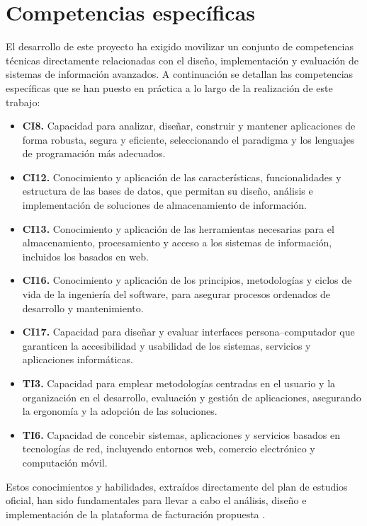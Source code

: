 \section{Competencias específicas}
\begin{large}
El desarrollo de este proyecto ha exigido movilizar un conjunto de competencias técnicas directamente relacionadas con el diseño, implementación y evaluación de sistemas de información avanzados. A continuación se detallan las competencias específicas que se han puesto en práctica a lo largo de la realización de este trabajo:

\begin{itemize}[label=\raisebox{0.15ex}{\scriptsize$\blacksquare$}]
  \item \textbf{CI8.} Capacidad para analizar, diseñar, construir y mantener aplicaciones de forma robusta, segura y eficiente, seleccionando el paradigma y los lenguajes de programación más adecuados.  
  \item \textbf{CI12.} Conocimiento y aplicación de las características, funcionalidades y estructura de las bases de datos, que permitan su diseño, análisis e implementación de soluciones de almacenamiento de información.  
  \item \textbf{CI13.} Conocimiento y aplicación de las herramientas necesarias para el almacenamiento, procesamiento y acceso a los sistemas de información, incluidos los basados en web.  
  \item \textbf{CI16.} Conocimiento y aplicación de los principios, metodologías y ciclos de vida de la ingeniería del software, para asegurar procesos ordenados de desarrollo y mantenimiento.  
  \item \textbf{CI17.} Capacidad para diseñar y evaluar interfaces persona–computador que garanticen la accesibilidad y usabilidad de los sistemas, servicios y aplicaciones informáticas.  
  \item \textbf{TI3.} Capacidad para emplear metodologías centradas en el usuario y la organización en el desarrollo, evaluación y gestión de aplicaciones, asegurando la ergonomía y la adopción de las soluciones.  
  \item \textbf{TI6.} Capacidad de concebir sistemas, aplicaciones y servicios basados en tecnologías de red, incluyendo entornos web, comercio electrónico y computación móvil.
\end{itemize}

Estos conocimientos y habilidades, extraídos directamente del plan de estudios oficial, han sido fundamentales para llevar a cabo el análisis, diseño e implementación de la plataforma de facturación propuesta \cite{grado2024ulpgc}.
\end{large}

